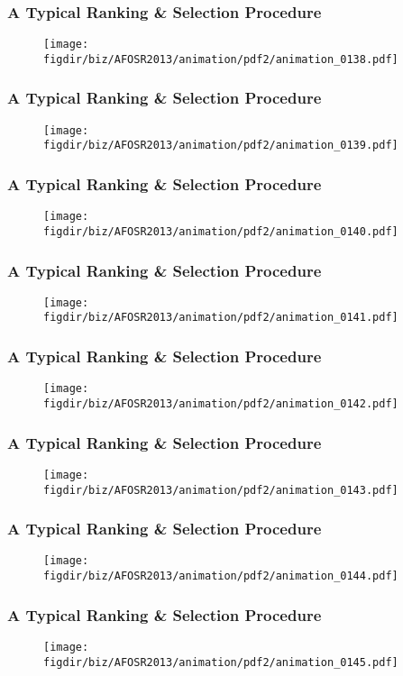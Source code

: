 \documentclass[13pt]{beamer}
\newcommand{\figdir}{../../fig}
\begin{document}
{\begin{frame}\frametitle{A Typical Ranking \& Selection Procedure}\begin{figure}\texttt{[image: \\figdir/biz/AFOSR2013/animation/pdf2/animation\_0138.pdf]}\end{figure}\end{frame}
\begin{frame}\frametitle{A Typical Ranking \& Selection Procedure}\begin{figure}\texttt{[image: \\figdir/biz/AFOSR2013/animation/pdf2/animation\_0139.pdf]}\end{figure}\end{frame}
\begin{frame}\frametitle{A Typical Ranking \& Selection Procedure}\begin{figure}\texttt{[image: \\figdir/biz/AFOSR2013/animation/pdf2/animation\_0140.pdf]}\end{figure}\end{frame}
\begin{frame}\frametitle{A Typical Ranking \& Selection Procedure}\begin{figure}\texttt{[image: \\figdir/biz/AFOSR2013/animation/pdf2/animation\_0141.pdf]}\end{figure}\end{frame}
\begin{frame}\frametitle{A Typical Ranking \& Selection Procedure}\begin{figure}\texttt{[image: \\figdir/biz/AFOSR2013/animation/pdf2/animation\_0142.pdf]}\end{figure}\end{frame}
\begin{frame}\frametitle{A Typical Ranking \& Selection Procedure}\begin{figure}\texttt{[image: \\figdir/biz/AFOSR2013/animation/pdf2/animation\_0143.pdf]}\end{figure}\end{frame}
\begin{frame}\frametitle{A Typical Ranking \& Selection Procedure}\begin{figure}\texttt{[image: \\figdir/biz/AFOSR2013/animation/pdf2/animation\_0144.pdf]}\end{figure}\end{frame}
\begin{frame}\frametitle{A Typical Ranking \& Selection Procedure}\begin{figure}\texttt{[image: \\figdir/biz/AFOSR2013/animation/pdf2/animation\_0145.pdf]}\end{figure}\end{frame}
}
\end{document}
